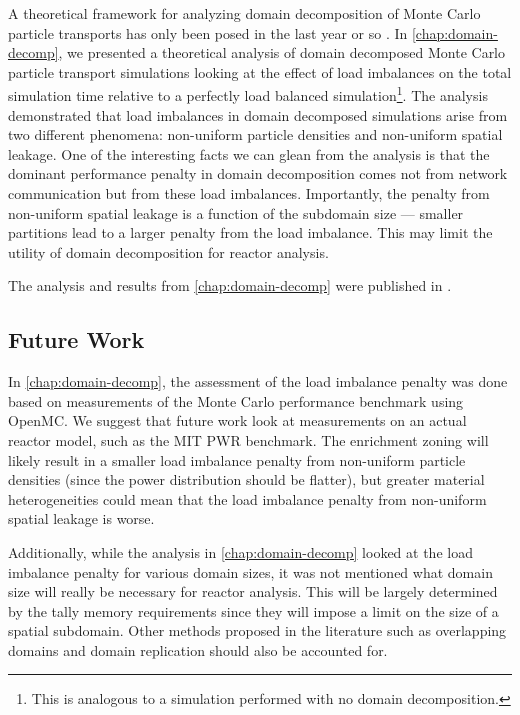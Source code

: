 A theoretical framework for analyzing domain decomposition of Monte Carlo
particle transports has only been posed in the last year or so
\cite{jcp-siegel-2012-1}. In \autoref{chap:domain-decomp}, we presented a
theoretical analysis of domain decomposed Monte Carlo particle transport
simulations looking at the effect of load imbalances on the total simulation
time relative to a perfectly load balanced simulation\footnote{This is analogous
  to a simulation performed with no domain decomposition.}. The analysis
demonstrated that load imbalances in domain decomposed simulations arise from
two different phenomena: non-uniform particle densities and non-uniform spatial
leakage. One of the interesting facts we can glean from the analysis is that the
dominant performance penalty in domain decomposition comes not from network
communication but from these load imbalances. Importantly, the penalty from
non-uniform spatial leakage is a function of the subdomain size --- smaller
partitions lead to a larger penalty from the load imbalance. This may limit the
utility of domain decomposition for reactor analysis.

The analysis and results from \autoref{chap:domain-decomp} were published in
\cite{jcp-siegel-2012-2}.

\subsection{Future Work}

In \autoref{chap:domain-decomp}, the assessment of the load imbalance penalty
was done based on measurements of the Monte Carlo performance benchmark using
OpenMC. We suggest that future work look at measurements on an actual reactor
model, such as the MIT PWR benchmark. The enrichment zoning will likely result
in a smaller load imbalance penalty from non-uniform particle densities (since
the power distribution should be flatter), but greater material heterogeneities
could mean that the load imbalance penalty from non-uniform spatial leakage is
worse.

Additionally, while the analysis in \autoref{chap:domain-decomp} looked at the
load imbalance penalty for various domain sizes, it was not mentioned what
domain size will really be necessary for reactor analysis. This will be largely
determined by the tally memory requirements since they will impose a limit on
the size of a spatial subdomain. Other methods proposed in the literature such
as overlapping domains and domain replication should also be accounted for.

